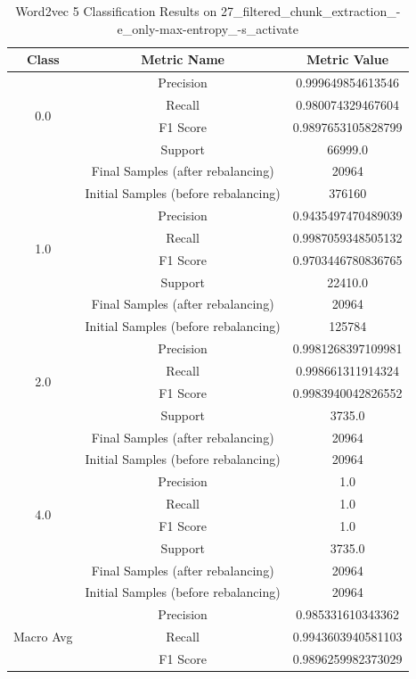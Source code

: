 \begin{longtable}{|c|c|c|}
\caption{Word2vec 5 Classification Results on 27\_filtered\_chunk\_extraction\_-e\_only-max-entropy\_-s\_activate} \label{tab:27_filtered_chunk_extraction_-e_only-max-entropy_-s_activate_word2vec_5_classifiers_results} \\
\hline
Class & Metric Name & Metric Value \\
\hline
\multirow{4}{*}{0.0} & Precision & 0.999649854613546 \\
 & Recall & 0.980074329467604 \\
 & F1 Score & 0.9897653105828799 \\
 & Support & 66999.0 \\
 & Final Samples (after rebalancing) & 20964 \\
 & Initial Samples (before rebalancing) & 376160 \\
\hline
\multirow{4}{*}{1.0} & Precision & 0.9435497470489039 \\
 & Recall & 0.9987059348505132 \\
 & F1 Score & 0.9703446780836765 \\
 & Support & 22410.0 \\
 & Final Samples (after rebalancing) & 20964 \\
 & Initial Samples (before rebalancing) & 125784 \\
\hline
\multirow{4}{*}{2.0} & Precision & 0.9981268397109981 \\
 & Recall & 0.998661311914324 \\
 & F1 Score & 0.9983940042826552 \\
 & Support & 3735.0 \\
 & Final Samples (after rebalancing) & 20964 \\
 & Initial Samples (before rebalancing) & 20964 \\
\hline
\multirow{4}{*}{4.0} & Precision & 1.0 \\
 & Recall & 1.0 \\
 & F1 Score & 1.0 \\
 & Support & 3735.0 \\
 & Final Samples (after rebalancing) & 20964 \\
 & Initial Samples (before rebalancing) & 20964 \\
\hline
\multirow{4}{*}{Macro Avg} & Precision & 0.985331610343362 \\
 & Recall & 0.9943603940581103 \\
 & F1 Score & 0.9896259982373029 \\

\end{longtable}

